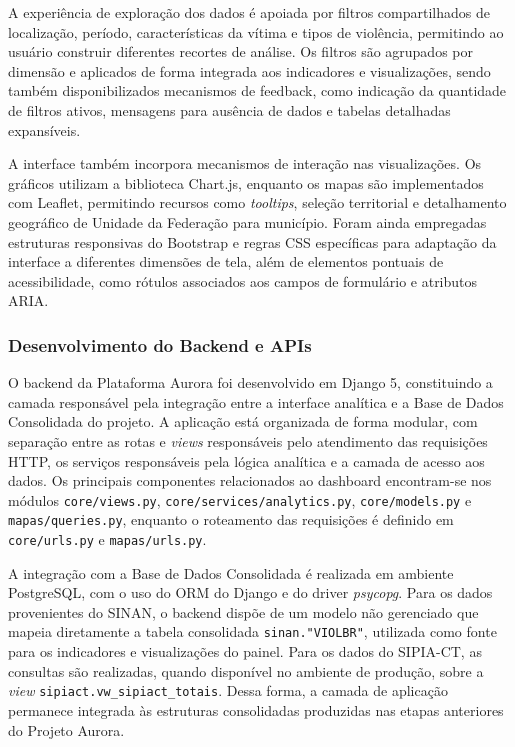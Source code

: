 \documentclass[11pt,a4paper]{article}
\begin{document}
A experiência de exploração dos dados é apoiada por filtros compartilhados de localização, período, características da vítima e tipos de violência, permitindo ao usuário construir diferentes recortes de análise. Os filtros são agrupados por dimensão e aplicados de forma integrada aos indicadores e visualizações, sendo também disponibilizados mecanismos de feedback, como indicação da quantidade de filtros ativos, mensagens para ausência de dados e tabelas detalhadas expansíveis. 

A interface também incorpora mecanismos de interação nas visualizações. Os gráficos utilizam a biblioteca Chart.js, enquanto os mapas são implementados com Leaflet, permitindo recursos como \textit{tooltips}, seleção territorial e detalhamento geográfico de Unidade da Federação para município. Foram ainda empregadas estruturas responsivas do Bootstrap e regras CSS específicas para adaptação da interface a diferentes dimensões de tela, além de elementos pontuais de acessibilidade, como rótulos associados aos campos de formulário e atributos ARIA. 

\subsubsection{Desenvolvimento do Backend e APIs}
\label{subsubsec:backend_apis_meta3}

O backend da Plataforma Aurora foi desenvolvido em Django 5, constituindo a
camada responsável pela integração entre a interface analítica e a Base de
Dados Consolidada do projeto. A aplicação está organizada de forma modular,
com separação entre as rotas e \textit{views} responsáveis pelo atendimento
das requisições HTTP, os serviços responsáveis pela lógica analítica e a
camada de acesso aos dados. Os principais componentes relacionados ao
dashboard encontram-se nos módulos \texttt{core/views.py},
\texttt{core/services/analytics.py}, \texttt{core/models.py} e
\texttt{mapas/queries.py}, enquanto o roteamento das requisições é definido
em \texttt{core/urls.py} e \texttt{mapas/urls.py}.

A integração com a Base de Dados Consolidada é realizada em ambiente
PostgreSQL, com o uso do ORM do Django e do driver \textit{psycopg}. Para os
dados provenientes do SINAN, o backend dispõe de um modelo não gerenciado que
mapeia diretamente a tabela consolidada \texttt{sinan."VIOLBR"}, utilizada
como fonte para os indicadores e visualizações do painel. Para os dados do
SIPIA-CT, as consultas são realizadas, quando disponível no ambiente de
produção, sobre a \textit{view}
\texttt{sipiact.vw\_sipiact\_totais}. Dessa forma, a camada de aplicação
permanece integrada às estruturas consolidadas produzidas nas etapas
anteriores do Projeto Aurora.
\end{document}
